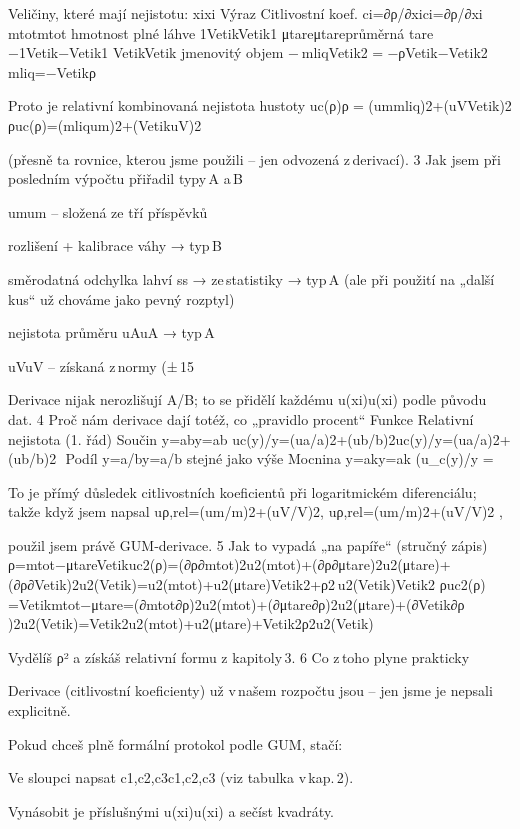 {Veličiny, které mají nejistotu:
xixi​	Výraz	Citlivostní koef. ci=∂ρ/∂xici​=∂ρ/∂xi​
mtotmtot​	hmotnost plné láhve	1VetikVetik​1​
μtareμtare​	průměrná tare	−1Vetik−Vetik​1​
VetikVetik​	jmenovitý objem	− mliqVetik2  =  −ρVetik−Vetik2​mliq​​=−Vetik​ρ​

Proto je relativní kombinovaná nejistota hustoty
uc(ρ)ρ  =  (ummliq)2+(uVVetik)2
ρuc​(ρ)​=(mliq​um​​)2+(Vetik​uV​​)2
​

(přesně ta rovnice, kterou jsme použili – jen odvozená z derivací).
3  Jak jsem při posledním výpočtu přiřadil typy A a B

    umum​ – složená ze tří příspěvků

        rozlišení + kalibrace váhy → typ B

        směrodatná odchylka lahví ss → ze statistiky → typ A (ale při použití na „další kus“ už chováme jako pevný rozptyl)

        nejistota průměru uAuA​ → typ A

    uVuV​ – získaná z normy (± 15 %

Derivace nijak nerozlišují A/B; to se přidělí každému u(xi)u(xi​) podle původu dat.
4  Proč nám derivace dají totéž, co „pravidlo procent“
Funkce	Relativní nejistota (1. řád)
Součin y=aby=ab	uc(y)/y=(ua/a)2+(ub/b)2uc​(y)/y=(ua​/a)2+(ub​/b)2
​
Podíl y=a/by=a/b	stejné jako výše
Mocnina y=aky=ak	(u_c(y)/y =

To je přímý důsledek citlivostních koeficientů při logaritmickém diferenciálu; takže když jsem napsal
uρ,rel=(um/m)2+(uV/V)2,
uρ,rel​=(um​/m)2+(uV​/V)2
​,

použil jsem právě GUM‑derivace.
5  Jak to vypadá „na papíře“ (stručný zápis)
ρ=mtot−μtareVetikuc2(ρ)=(∂ρ∂mtot)2u2(mtot)+(∂ρ∂μtare)2u2(μtare)+(∂ρ∂Vetik)2u2(Vetik)=u2(mtot)+u2(μtare)Vetik2+ρ2 u2(Vetik)Vetik2
ρuc2​(ρ)​=Vetik​mtot​−μtare​​=(∂mtot​∂ρ​)2u2(mtot​)+(∂μtare​∂ρ​)2u2(μtare​)+(∂Vetik​∂ρ​)2u2(Vetik​)=Vetik2​u2(mtot​)+u2(μtare​)​+Vetik2​ρ2u2(Vetik​)​​

Vydělíš ρ² a získáš relativní formu z kapitoly 3.
6  Co z toho plyne prakticky

    Derivace (citlivostní koeficienty) už v našem rozpočtu jsou – jen jsme je nepsali explicitně.

    Pokud chceš plně formální protokol podle GUM, stačí:

        Ve sloupci napsat c1,c2,c3c1​,c2​,c3​ (viz tabulka v kap. 2).

        Vynásobit je příslušnými u(xi)u(xi​) a sečíst kvadráty.

}
